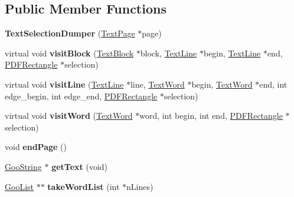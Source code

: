 \subsection*{Public Member Functions}
\begin{DoxyCompactItemize}
\item 
\mbox{\label{class_text_selection_dumper_a614f51af313ca2f5116cd5b652ebfc3c}} 
{\bfseries Text\+Selection\+Dumper} (\hyperlink{class_text_page}{Text\+Page} $\ast$page)
\item 
\mbox{\label{class_text_selection_dumper_a01e0242512f3578e96eaaf63694622d0}} 
virtual void {\bfseries visit\+Block} (\hyperlink{class_text_block}{Text\+Block} $\ast$block, \hyperlink{class_text_line}{Text\+Line} $\ast$begin, \hyperlink{class_text_line}{Text\+Line} $\ast$end, \hyperlink{class_p_d_f_rectangle}{P\+D\+F\+Rectangle} $\ast$selection)
\item 
\mbox{\label{class_text_selection_dumper_aa61f65d46355bc2a5e2ec67491f1b580}} 
virtual void {\bfseries visit\+Line} (\hyperlink{class_text_line}{Text\+Line} $\ast$line, \hyperlink{class_text_word}{Text\+Word} $\ast$begin, \hyperlink{class_text_word}{Text\+Word} $\ast$end, int edge\+\_\+begin, int edge\+\_\+end, \hyperlink{class_p_d_f_rectangle}{P\+D\+F\+Rectangle} $\ast$selection)
\item 
\mbox{\label{class_text_selection_dumper_ad8ad3f29ece16662ae496d5da3454f6b}} 
virtual void {\bfseries visit\+Word} (\hyperlink{class_text_word}{Text\+Word} $\ast$word, int begin, int end, \hyperlink{class_p_d_f_rectangle}{P\+D\+F\+Rectangle} $\ast$selection)
\item 
\mbox{\label{class_text_selection_dumper_a39483b3fd4d29a29caee0173e5d91522}} 
void {\bfseries end\+Page} ()
\item 
\mbox{\label{class_text_selection_dumper_af489b5a32951798aebe5fbd7229d979f}} 
\hyperlink{class_goo_string}{Goo\+String} $\ast$ {\bfseries get\+Text} (void)
\item 
\mbox{\label{class_text_selection_dumper_a7192c76b9a1e4be41d45609ad04e0749}} 
\hyperlink{class_goo_list}{Goo\+List} $\ast$$\ast$ {\bfseries take\+Word\+List} (int $\ast$n\+Lines)
\end{DoxyCompactItemize}
